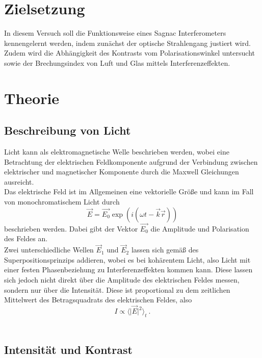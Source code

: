 \section{Zielsetzung}
In diesem Versuch soll die Funktionsweise eines Sagnac Interferometers kennengelernt werden,
indem zunächst der optische Strahlengang justiert wird. Zudem wird die Abhängigkeit des
Kontrasts vom Polarisationswinkel untersucht sowie der Brechungsindex von Luft und Glas mittels
Interferenzeffekten.

\section{Theorie}
\label{sec:Theorie}
\subsection{Beschreibung von Licht}

Licht kann als elektromagnetische Welle beschrieben werden, wobei eine Betrachtung der
elektrischen Feldkomponente aufgrund der Verbindung zwischen elektrischer und
magnetischer Komponente durch die Maxwell Gleichungen ausreicht. \\
Das elektrische Feld ist im Allgemeinen eine vektorielle Größe und kann im Fall von
monochromatischem Licht durch
\begin{equation}
  \vec{E}=\vec{E_0}\exp{\left(i (\omega t-\vec{k}\vec{r})\right)}
\end{equation}
beschrieben werden. Dabei gibt der Vektor $\vec{E_0}$ die Amplitude und Polarisation des Feldes
an. \\
Zwei unterschiedliche Wellen $\vec{E}_1$ und $\vec{E}_2$ lassen sich gemäß des
Superpositionsprinzips addieren, wobei es bei kohärentem Licht, also Licht mit einer festen Phasenbeziehung
zu Interferenzeffekten kommen kann. Diese lassen sich jedoch nicht direkt über die Amplitude
des elektrischen Feldes messen, sondern nur über die Intensität. Diese ist proportional
zu dem zeitlichen Mittelwert des Betragsquadrats des elektrischen Feldes, also
\begin{equation}
  I \propto \langle \lvert \vec{E} \rvert^2 \rangle_t \: .
\end{equation} \\
\subsection{Intensität und Kontrast}

